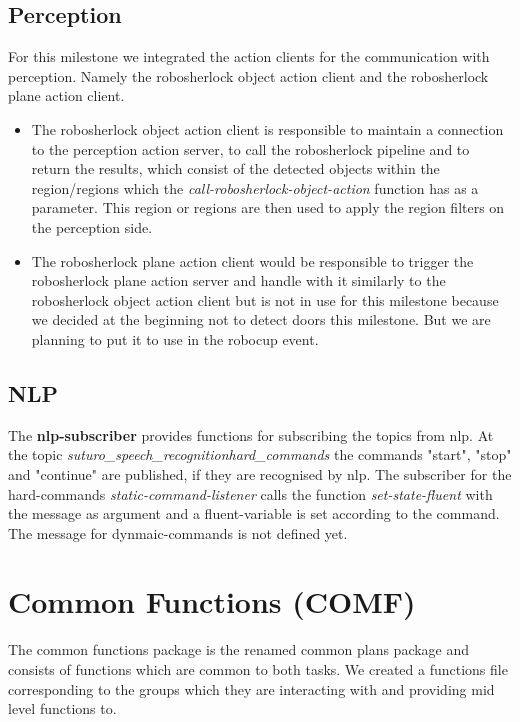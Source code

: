 \documentclass[main.tex]{subfiles}
\begin{document}
                \subsection{Perception}
	                For this milestone we integrated the action clients for the communication with perception. Namely the robosherlock object action client and the robosherlock plane action client.
	                \begin{itemize}
	                	\item The robosherlock object action client is responsible to maintain a connection to the perception action server, to call the robosherlock pipeline and to return the results, which consist of the detected objects within the region/regions which the \textit{call-robosherlock-object-action} function has as a parameter. This region or regions are then used to apply the region filters on the perception side.
	                	\item The robosherlock plane action client would be responsible to trigger the robosherlock plane action server and handle with it similarly to the robosherlock object action client but is not in use for this milestone because we decided at the beginning not to detect doors this milestone. But we are planning to put it to use in the robocup event. 
	                \end{itemize} 
                \subsection{NLP}
	                The \textbf{nlp-subscriber} provides functions for subscribing the topics from nlp. At the topic \textit{suturo\_speech\_recognition\/hard\_commands} the commands "start", "stop" and "continue" are published, if they are recognised by nlp. The subscriber for the hard-commands \textit{static-command-listener} calls the function \textit{set-state-fluent} with the message as argument and a fluent-variable is set according to the command. The message for dynmaic-commands is not defined yet.

                
                \section{Common Functions (COMF)}
	                The common functions package is the renamed common plans package and consists of functions which are common to both tasks. We created a functions file corresponding to the groups which they are interacting with and providing mid level functions to.
\end{document}
